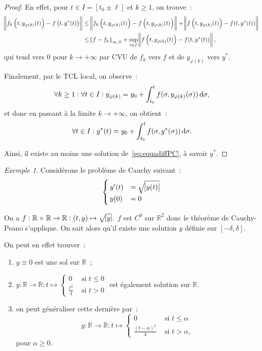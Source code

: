 \documentclass{report}
\theoremstyle{definition}
\theoremstyle{remark}
\newtheorem{ex}{Exemple}[chapter]
\numberwithin{equation}{section}
\newcommand{\R}{\mathbb R}
\newcommand{\pinfty}{{+\infty}}
\begin{document}
\begin{proof}
		En effet, pour $t \in I = [t_0 \pm \ell]$ et $k \geq 1$, on trouve~:
		\begin{align}
			\norm {f_k\left(t, y_{\varphi(k)}(t)\right) - f\left(t, y^*(t)\right)}
				&\leq \norm {f_k\left(t, y_{\varphi(k)}(t)\right) - f\left(t, y_{\varphi(k)}(t)\right)} + \norm {f\left(t, y_{\varphi(k)}(t)\right) - f(t, y^*(t))} \\
			&\leq \norm {f-f_k}_{\infty, S} + \sup_{t \in I}\norm {f\left(t, y_{\varphi(k)}(t)\right) - f(t, y^*(t))},
		\end{align}
		qui tend vers $0$ pour $k \to \pinfty$ par CVU de $f_k$ vers $f$ et de $y_{\varphi(k)}$ vers $y^*$.

		Finalement, par le TCL local, on observe~:
		\begin{equation}
			\forall k \geq 1 : \forall t \in I : y_{\varphi(k)} = y_0 + \int_{t_0}^tf(\sigma, y_{\varphi(k)}(\sigma))\dif \sigma,
		\end{equation}
		et donc en passant à la limite $k \to \pinfty$, on obtient~:
		\begin{equation}
			\forall t \in I : y^*(t) = y_0 + \int_{t_0}^tf(\sigma, y^*(\sigma))\dif \sigma.
		\end{equation}

		Ainsi, il existe au moins une solution de~\eqref{eq:equadiffPC}, à savoir $y^*$.
		\end{proof}

		\begin{ex} Considérons le problème de Cauchy suivant~:
		\begin{equation}
			\begin{cases}
			y'(t) &= \sqrt {\abs {y(t)}} \\
			y(0) &= 0
		\end{cases}
		\end{equation}

		On a $f : \R \times \R \to \R : (t, y) \mapsto \sqrt {\abs y}.$ $f$ est $C^0$ sur $\R^2$ donc le théorème de Cauchy-Peano s'applique. On sait alors
		qu'il existe une solution $y$ définie sur $[-\delta, \delta]$.

		On peut en effet trouver~:
		\begin{enumerate}
			\item $y \equiv 0$ est une sol sur $\R$~;
			\item $y : \R \to \R : t \mapsto \begin{cases}0 &\text{ si } t \leq 0 \\\frac {t^2}4 &\text{ si } t > 0\end{cases}$ est également solution sur $\R$.
			\item on peut généraliser cette dernière par~:
			\begin{equation}
				y : \R \to \R : t \mapsto \begin{cases}0 &\text{ si } t \leq \alpha \\ \frac {(t-\alpha)^2}4 &\text{ si } t > \alpha,\end{cases}
			\end{equation}
			pour $\alpha \geq 0$.
		\end{enumerate}
		\end{ex}
\end{document}

